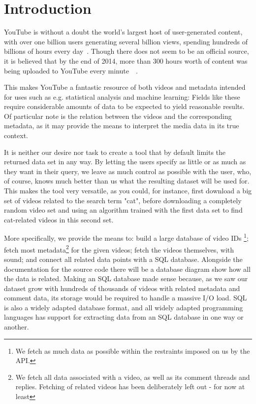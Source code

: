 
\section{Introduction}

YouTube is without a doubt the world's largest host of user-generated content,
with over one billion users generating several billion views, spending hundreds
of billions of hours every day~\cite{officialstats}. Though there does not seem
to be an official source, it is believed that by the end of 2014, more than 300
hours worth of content was being uploaded to YouTube every
minute~\cite{dagensmediastats}~\cite{reelseostats}. 

This makes YouTube a fantastic resource of both videos and metadata intended for
uses such as e.g. statistical analysis and machine learning: Fields like these
require considerable amounts of data to be expected to yield reasonable results.
Of particular note is the relation between the videos and the corresponding 
metadata, as it may provide the means to interpret the media data in its true
context.

It is neither our desire nor task to create a tool that by default limits the
returned data set in any way. By letting the users specify as little or as much
as they want in their query, we leave as much control as possible with the user,
who, of course, knows much better than us what the resulting dataset will be
used for. This makes the tool very versatile, as you could, for instance, first
download a big set of videos related to the search term "cat", before
downloading a completely random video set and using an algorithm trained with
the first data set to find cat-related videos in this second set. 

More specifically, we provide the means to: build a large database of video IDs
\footnote{We fetch as much data as possible within the restraints imposed
on us by the API.}; fetch most metadata\footnote{We fetch all data associated
with a video, as well as its comment threads and replies. Fetching of related
videos has been deliberately left out - for now at least} for the given videos;
fetch the videos themselves, with sound; and connect all related data points
with a SQL database. Alongside the documentation for the source code there will
be a database diagram show how all the data is related. Making an SQL database
made sense because, as we saw our dataset grow with hundreds of thousands of
videos with related metadata and comment data, its storage would be required
to handle a massive I/O load. SQL is also a widely adapted database
format, and all widely adapted programming languages has support for
extracting data from an SQL database in one way or another.

